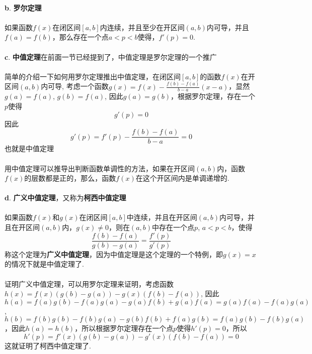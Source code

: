 \paragraph{}
\textbf{b}. \textbf{罗尔定理}

\paragraph{}
如果函数$f(x)$在闭区间$[a, b]$内连续，并且至少在开区间$(a, b)$内可导，并且$f(a) = f(b)$，那么存在一个点$a < p < b$使得，$f'(p) = 0$.

\paragraph{}
\textbf{c}. \textbf{中值定理}在前面一节已经提到了，中值定理是罗尔定理的一个推广

\paragraph{}
简单的介绍一下如何用罗尔定理推出中值定理，在闭区间$[a, b]$的函数$f(x)$在开区间$(a, b)$内可导, 考虑一个函数$g(x) = f(x)  - \frac{f(b) - f(a)}{b-a} (x - a)$，显然$g(a) = f(a)$, $g(b) = f(a)$, 因此$g(a) = g(b)$，根据罗尔定理，存在一个$p$使得
$$
g'(p) = 0
$$
因此
$$
g'(p) = f'(p) - \frac{f(b) - f(a)}{b-a} = 0
$$
也就是中值定理

\paragraph{}
用中值定理可以推导出判断函数单调性的方法，如果在开区间$(a, b)$内，函数$f(x)$的层数都是正的，那么，函数$f(x)$在这个开区间内是单调递增的.

\paragraph{}
\textbf{d}. \textbf{广义中值定理}，又称为\textbf{柯西中值定理}

\paragraph{}
如果函数$f(x)$和$g(x)$在闭区间$[a, b]$中连续，并且在开区间$(a, b)$内可导，并且在开区间$(a, b)$内，$g(x) \neq 0$，则在$(a, b)$中存在一个点$p$, $a < p < b$，使得
$$
\frac{f(b) - f(a)}{g(b) - g(a)} = \frac{f'(p)}{g'(p)}
$$
称这个定理为\textbf{广义中值定理}，因为中值定理是这个定理的一个特例，即$g(x) = x$的情况下就是中值定理了.

\paragraph{}
证明广义中值定理，可以用罗尔定理来证明，考虑函数$h(x) = f(x) ( g(b) - g(a)) - g(x) (f(b) - f(a))$, 因此$h(a) = f(a) g(b) - f(a) g(a) - g(a) f(b) + g(a)f(a) = g(a)f(a) - f(a) g(a)$, $h(b) = f(b) g(b) - f(b) g(a) - g(b)f(b) + f(a)g(b) = f(a)g(b) - f(b)g(a)$，因此$h(a) = h(b)$，所以根据罗尔定理存在一个点$p$使得$h'(p) = 0$，所以
$$
h'(p) = f'(x) (g(b)- g(a)) - g'(x) (f(b) - f(a)) = 0
$$
这就证明了柯西中值定理了.


